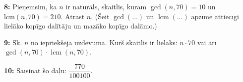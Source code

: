 \documentclass[11pt]{article}
\newenvironment{uzdevums}[1][\unskip]{%
\vspace{3mm}
\noindent
\textbf{#1:}
\noindent}
{}
\begin{document}
\begin{uzdevums}[8]
Pieņemsim, ka $n$ ir naturāls, skaitlis, kuram $\gcd(n, 70) = 10$ un $\mathrm{lcm}(n, 70) = 210$. 
Atrast $n$. (Šeit $\gcd(\ldots)$ un $\operatorname{lcm}(\ldots)$
apzīmē attiecīgi lielāko kopīgo dalītāju un mazāko kopīgo dalāmo.)
\end{uzdevums}

\begin{uzdevums}[9]
Sk. $n$ no iepriekšējā uzdevuma. Kurš skaitlis ir lielāks: $n \cdot 70$ vai arī
$\gcd(n, 70) \cdot \operatorname{lcm}(n,70)$.  
\end{uzdevums}

\begin{uzdevums}[10]
Saīsināt šo daļu:
$\dfrac{770}{100100}$.
\end{uzdevums}
\end{document}
